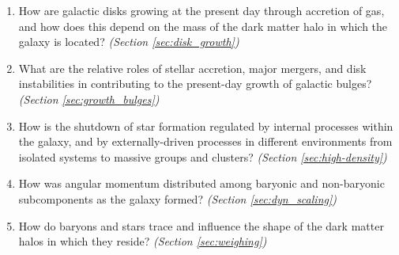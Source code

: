 \documentclass[preprint,11pt]{aastex}
\begin{document}

\begin {enumerate} 

\item How are galactic disks growing at the present day through
  accretion of gas, and how does this depend on the mass of the dark
  matter halo in which the galaxy is located?  {\em (Section
    \ref{sec:disk_growth})}

\item What are the relative roles of stellar accretion, major mergers,
  and disk instabilities in contributing to the present-day growth of
  galactic bulges? {\em (Section \ref{sec:growth_bulges})}



\item How is the shutdown of star formation regulated by
  internal processes within the galaxy, and by externally-driven processes 
  in different environments from isolated systems to massive groups and clusters? {\em (Section \ref{sec:high-density})}
  
\item How was angular momentum distributed among baryonic and
  non-baryonic subcomponents as the galaxy formed? {\em (Section
    \ref{sec:dyn_scaling})}

\item How do baryons and stars trace and influence the shape of the
  dark matter halos in which they reside? {\em (Section
    \ref{sec:weighing})}

\end {enumerate}
\end{document}
